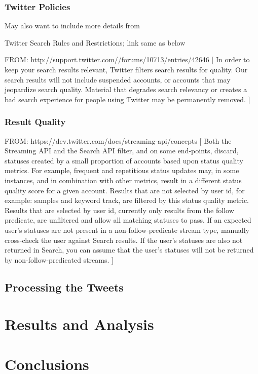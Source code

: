 \documentclass[12pt,a4paper]{report}
\begin{document}
\subsection{Twitter Policies}

May also want to include more details from

Twitter Search Rules and Restrictions; link same as below

FROM: http://support.twitter.com//forums/10713/entries/42646
[
In order to keep your search results relevant, Twitter filters search 
results for quality. Our search results will not include suspended accounts, 
or accounts that may jeopardize search quality. Material that degrades 
search relevancy or creates a bad search experience for 
people using Twitter may be permanently removed.
]
\subsection{Result Quality}

FROM: https://dev.twitter.com/docs/streaming-api/concepts
[
Both the Streaming API and the Search API filter, and on some end-points,
discard, statuses created by a small proportion of accounts based upon status
quality metrics. For example, frequent and repetitious status updates may,
in some instances, and in combination with other metrics, result in a
different status quality score for a given account. Results that are not selected
by user id, for example: samples and keyword track, are filtered by this
status quality metric. Results that are selected by user id, currently only
results from the follow predicate, are unfiltered and allow all
matching statuses to pass. If an expected user's statuses are not present in a
non-follow-predicate stream type, manually cross-check the user against Search
results. If the user's statuses are also not returned in Search, you can assume
that the user's statuses will not be returned by non-follow-predicated streams.
]

\section{Processing the Tweets}

\chapter{Results and Analysis}


\chapter{Conclusions}
\end{document}
